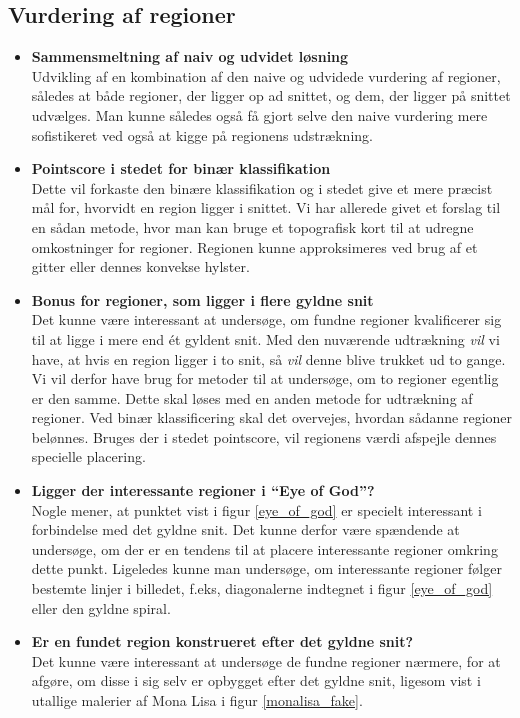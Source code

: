 {\subsection{Vurdering af regioner}
\begin{itemize}
    \item \textbf{Sammensmeltning af naiv og udvidet løsning}\\
        Udvikling af en kombination af den naive og udvidede vurdering
		af regioner, således
        at både regioner, der ligger op ad snittet, og dem, der ligger på
        snittet udvælges. Man kunne således også få gjort selve den naive
        vurdering mere sofistikeret ved også at kigge på regionens
        udstrækning.
    \item \textbf{Pointscore i stedet for binær klassifikation}\\
        Dette vil forkaste den binære klassifikation og i stedet give et
        mere præcist mål for, hvorvidt en region ligger i snittet.  Vi
        har allerede givet et forslag til en sådan metode, hvor man kan
        bruge et topografisk kort til at udregne omkostninger for
        regioner.  Regionen kunne approksimeres ved brug af et gitter
        eller dennes konvekse hylster.
    \item \textbf{Bonus for regioner, som ligger i flere gyldne snit}\\
        Det kunne være interessant at undersøge, om fundne regioner
        kvalificerer sig til at ligge i mere end ét gyldent snit. Med
        den nuværende udtrækning \emph{vil} vi have, at hvis en region
        ligger i to snit, så \emph{vil} denne blive trukket ud to gange.
        Vi vil derfor have brug for metoder til at undersøge, om to
        regioner egentlig er den samme. Dette skal løses med en anden
        metode for udtrækning af regioner. Ved binær klassificering skal
        det overvejes, hvordan sådanne regioner belønnes. Bruges der i
        stedet pointscore, vil regionens værdi afspejle dennes specielle
        placering.
    \item \textbf{Ligger der interessante regioner i ``Eye of God''?}\\
        Nogle mener, at punktet vist i figur \ref{eye_of_god} er
        specielt interessant i forbindelse med det gyldne snit. Det
        kunne derfor være spændende at undersøge, om der er en tendens
        til at placere interessante regioner omkring dette punkt.
        Ligeledes kunne man undersøge, om
        interessante regioner følger bestemte linjer i billedet, f.eks,
        diagonalerne indtegnet i figur \ref{eye_of_god} eller den gyldne
        spiral.
    \item \textbf{Er en fundet region konstrueret efter det gyldne snit?}\\
        Det kunne være interessant at undersøge de fundne regioner
        nærmere, for at afgøre, om disse i sig selv er opbygget efter
        det gyldne snit, ligesom vist i utallige malerier af Mona Lisa i
        figur \ref{monalisa_fake}.
\end{itemize}


}
